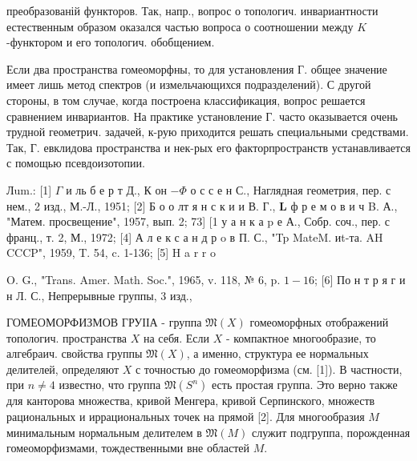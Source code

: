 \documentclass[10pt]{article}
\begin{document}
преобразованій функторов. Так, напр., вопрос о топологич. инвариантности естественным образом оказался частью вопроса о соотношении между $K$-функтором и его топологич. обобщением.



Если два пространства гомеоморфны, то для установления Г. общее значение имеет лишь метод спектров (и измельчающихся подразделений). С другой стороны, в том случае, когда построена классификация, вопрос решается сравнением инвариантов. На практике установление Г. часто оказывается очень трудной геометрич. задачей, к-рую приходится решать специальными средствами. Так, Г. евклидова пространства и нек-рых его факторпространств устанавливается с помощью псевдоизотопии.



Лum.: [1] $\Gamma$ и ль б е р т Д., К он $-\Phi$ о с с е н С., Наглядная геометрия, пер. с нем., 2 изд., М.-Л., 1951; [2] Б о о лт я н с к и и В. Г., $\mathbf{L}$ ф р е м о в и ч B. А., "Матем. просвещение", 1957, вып. 2; 73] [1 у а н к а p е А., Собр. соч., пер. с франц., т. 2, М., 1972; [4] А л е к с а н д р o в П. С., "Tp MateM. иt-та. AH CCCP", 1959, T. 54, c. 1-136; [5] H a r r o

O. G., "Trans. Amer. Math. Soc.", 1965, v. 118, № 6, p. $1-16$; [6] По н т р я г и н Л. С., Непрерывные группы, 3 изд.,



ГОМЕОМОРФИЗМОВ ГРУІІА - группа $\mathfrak{M}(X)$ гомеоморфных отображений топологич. пространства $X$ на себя. Если $X$ - компактное многообразие, то алгебраич. свойства группы $\mathfrak{M}(X)$, а именно, структура ее нормальных делителей, определяют $X$ с точностью до гомеоморфизма (см. [1]). В частности, при $n \neq 4$ известно, что группа $\mathfrak{M}\left(S^{n}\right)$ есть простая группа. Это верно также для канторова множества, кривой Менгера, кривой Серпинского, множеств рациональных и иррациональных точек на прямой [2]. Для многообразия $M$ минимальным нормальным делителем в $\mathfrak{M}(M)$ служит подгруппа, порожденная гомеоморфизмами, тождественными вне областей $M$.
\end{document}
